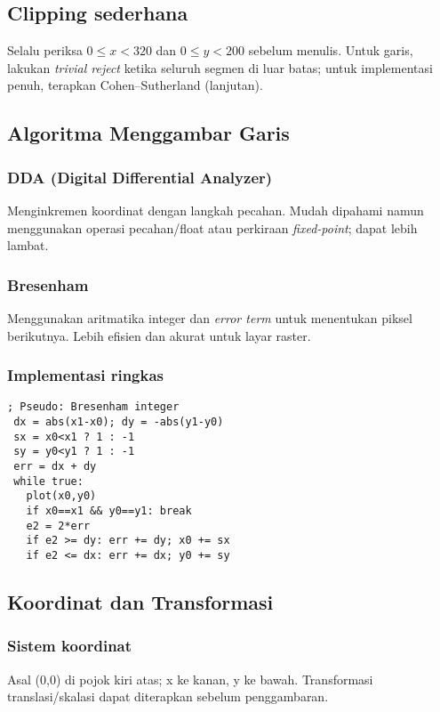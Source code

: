 \subsection{Clipping sederhana}
Selalu periksa \(0 \le x < 320\) dan \(0 \le y < 200\) sebelum menulis. Untuk garis, lakukan \textit{trivial reject} ketika seluruh segmen di luar batas; untuk implementasi penuh, terapkan Cohen–Sutherland (lanjutan). \cite{osdev_wiki}

\subsection{Algoritma Menggambar Garis}
\subsubsection{DDA (Digital Differential Analyzer)}
Menginkremen koordinat dengan langkah pecahan. Mudah dipahami namun menggunakan operasi pecahan/float atau perkiraan \textit{fixed-point}; dapat lebih lambat.

\subsubsection{Bresenham}
Menggunakan aritmatika integer dan \textit{error term} untuk menentukan piksel berikutnya. Lebih efisien dan akurat untuk layar raster.

\subsubsection{Implementasi ringkas}
\begin{verbatim}
; Pseudo: Bresenham integer
 dx = abs(x1-x0); dy = -abs(y1-y0)
 sx = x0<x1 ? 1 : -1
 sy = y0<y1 ? 1 : -1
 err = dx + dy
 while true:
   plot(x0,y0)
   if x0==x1 && y0==y1: break
   e2 = 2*err
   if e2 >= dy: err += dy; x0 += sx
   if e2 <= dx: err += dx; y0 += sy
\end{verbatim}

\subsection{Koordinat dan Transformasi}
\subsubsection{Sistem koordinat}
Asal (0,0) di pojok kiri atas; x ke kanan, y ke bawah. Transformasi translasi/skalasi dapat diterapkan sebelum penggambaran.

